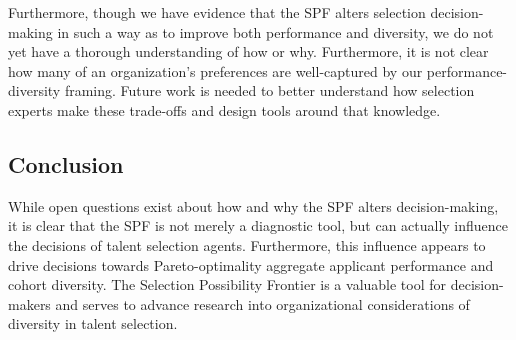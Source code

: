 Furthermore, though we have evidence that the SPF alters selection decision-making in such a way as to improve both performance and diversity, we do not yet have a thorough understanding of how or why. Furthermore, it is not clear how many of an organization's preferences are well-captured by our performance-diversity framing. Future work is needed to better understand how selection experts make these trade-offs and design tools around that knowledge.

\subsection{Conclusion}
While open questions exist about how and why the SPF alters decision-making, it is clear that the SPF is not merely a diagnostic tool, but can actually influence the decisions of talent selection agents. Furthermore, this influence appears to drive decisions towards Pareto-optimality aggregate applicant performance and cohort diversity. The Selection Possibility Frontier is a valuable tool for decision-makers and serves to advance research into organizational considerations of diversity in talent selection.